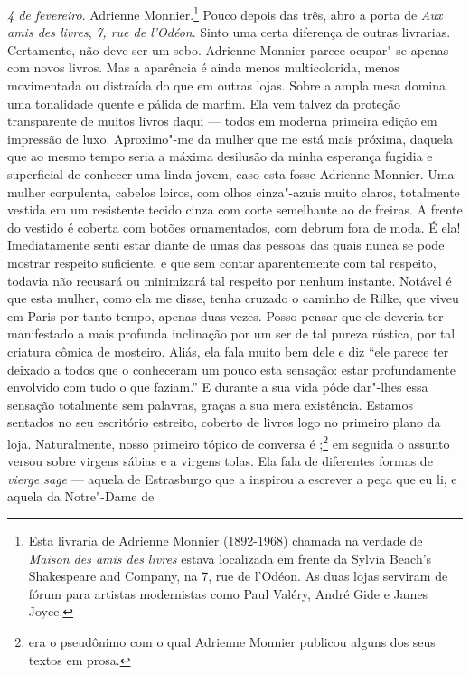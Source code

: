 \emph{4 de fevereiro}. Adrienne Monnier.\footnote{Esta livraria de
  Adrienne Monnier (1892-1968) chamada na verdade de \emph{Maison des
  amis des livres} estava localizada em frente da Sylvia Beach's
  Shakespeare and Company, na 7, rue de l'Odéon. As duas lojas serviram
  de fórum para artistas modernistas como Paul Valéry, André Gide e
  James Joyce. \versal{[N. E.]}} Pouco depois das três, abro a porta de \emph{Aux amis
des livres}, \emph{7, rue de l'Odéon}. Sinto uma certa diferença de
outras livrarias. Certamente, não deve ser um sebo. Adrienne Monnier
parece ocupar"-se apenas com novos livros. Mas a aparência é ainda menos
multicolorida, menos movimentada ou distraída do que em outras lojas.
Sobre a ampla mesa domina uma tonalidade quente e pálida de marfim. Ela
vem talvez da proteção transparente de muitos livros daqui --- todos em
moderna primeira edição em impressão de luxo. Aproximo"-me da mulher que
me está mais próxima, daquela que ao mesmo tempo seria a máxima
desilusão da minha esperança fugidia e superficial de conhecer uma linda
jovem, caso esta fosse Adrienne Monnier. Uma mulher corpulenta, cabelos
loiros, com olhos cinza"-azuis muito claros, totalmente vestida em um
resistente tecido cinza com corte semelhante ao de freiras. A frente do
vestido é coberta com botões ornamentados, com debrum fora de moda. É
ela! Imediatamente senti estar diante de umas das pessoas das quais
nunca se pode mostrar respeito suficiente, e que sem contar
aparentemente com tal respeito, todavia não recusará ou minimizará tal
respeito por nenhum instante. Notável é que esta mulher, como ela me
disse, tenha cruzado o caminho de Rilke, que viveu em Paris por tanto
tempo, apenas duas vezes. Posso pensar que ele deveria ter manifestado a
mais profunda inclinação por um ser de tal pureza rústica, por tal
criatura cômica de mosteiro. Aliás, ela fala muito bem dele e diz ``ele
parece ter deixado a todos que o conheceram um pouco esta sensação:
estar profundamente envolvido com tudo o que faziam.'' E durante a sua
vida pôde dar"-lhes essa sensação totalmente sem palavras, graças a sua
mera existência. Estamos sentados no seu escritório estreito, coberto de
livros logo no primeiro plano da loja. Naturalmente, nosso primeiro
tópico de conversa é ;\footnote{ era o pseudônimo com o
  qual Adrienne Monnier publicou alguns dos seus textos em prosa. \versal{[N. E.]}} em
seguida o assunto versou sobre virgens sábias e a virgens tolas. Ela
fala de diferentes formas de \emph{vierge sage} --- aquela de Estrasburgo
que a inspirou a escrever a peça que eu li, e aquela da Notre"-Dame de
